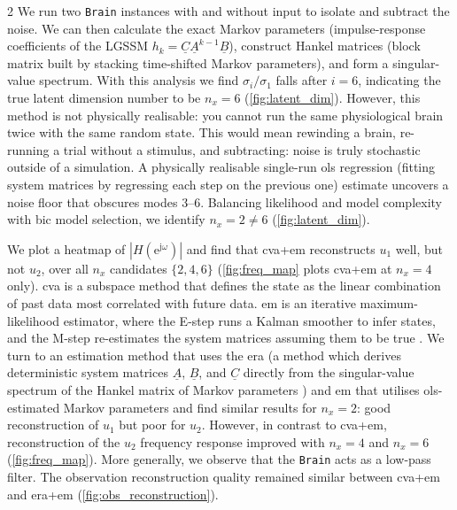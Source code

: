 \documentclass[a4paper, 10pt]{article}
\let\cite\supercite
\newcommand{\Brain}{\texttt{Brain}\xspace}
\begin{document}
\begin{multicols*}{2}
  We run two \Brain instances with and without input to isolate and subtract the
  noise. We can then calculate the exact Markov parameters (impulse-response
  coefficients of the LGSSM $h_k =
    \underline{C}\underline{A}^{k-1}\underline{B}$), construct Hankel matrices
  (block matrix built by stacking time-shifted Markov parameters), and form a
  singular-value spectrum. With this analysis we find $\sigma_i / \sigma_1$ falls
  after $i=6$, indicating the true latent dimension number to be $n_x=6$
  (\autoref{fig:latent_dim}). However, this method is not physically realisable:
  you cannot run the same physiological brain twice with the same random state.
  This would mean rewinding a brain, re-running a trial without a stimulus, and
  subtracting: noise is truly stochastic outside of a simulation. A physically
  realisable single-run \ac{ols} regression (fitting system matrices by
  regressing each step on the previous one) estimate uncovers a noise floor that
  obscures modes 3--6. Balancing likelihood and model complexity with \ac{bic}
  model selection, we identify $n_x=2 \ne 6$ (\autoref{fig:latent_dim}).


  We plot a heatmap of $|H(\mathrm{e}^{\mathrm{j}\omega})|$ and find that
  \ac{cva}+\ac{em} reconstructs $u_1$ well, but not $u_2$, over all $n_x$
  candidates $\{2, 4, 6\}$ (\autoref{fig:freq_map} plots \ac{cva}+\ac{em} at
  $n_x=4$ only).
  \ac{cva} is a subspace method that defines the state as the linear combination
  of past data most correlated with future data. \ac{em} is an iterative
  maximum-likelihood estimator, where the E-step runs a Kalman smoother to infer
  states, and the M-step re-estimates the system matrices assuming them to be true
  \cite{shumwayApproachTimeSeries1982}. We turn to an estimation method that
  uses the \ac{era} (a method which derives deterministic system matrices
  $\underline{A}$, $\underline{B}$, and $\underline{C}$ directly from the
  singular-value spectrum of the Hankel matrix of Markov parameters
  \cite{juangEigensystemRealizationAlgorithm1985}) and \ac{em} that utilises
  \ac{ols}-estimated Markov parameters and find similar results for $n_x=2$:
  good reconstruction of $u_1$ but poor for $u_2$. However, in contrast to
  \ac{cva}+\ac{em}, reconstruction of the $u_2$ frequency response improved with
  $n_x=4$ and $n_x=6$ (\autoref{fig:freq_map}). More generally, we observe that
  the \Brain acts as a low-pass filter. The observation reconstruction quality
  remained similar between \ac{cva}+\ac{em} and \ac{era}+\ac{em}
  (\autoref{fig:obs_reconstruction}).


\end{multicols*}
\end{document}
